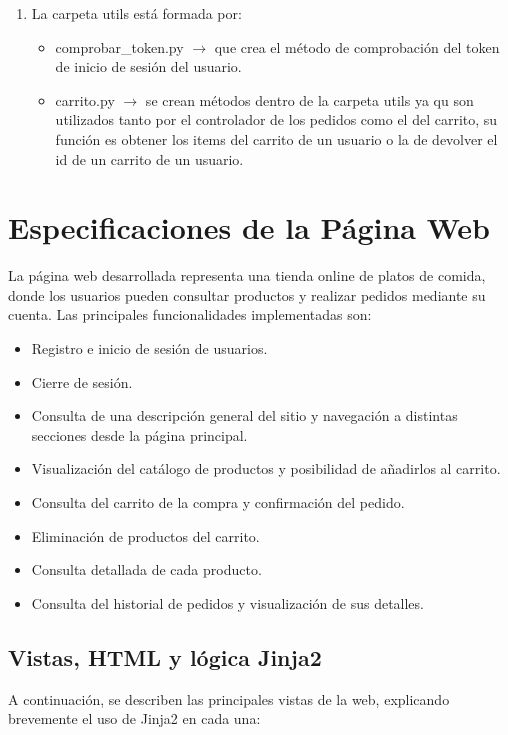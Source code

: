 \documentclass[10pt]{book}
\begin{document}
\begin{enumerate}
        \item La carpeta utils está formada por:
            \begin{itemize}
                \item comprobar\_token.py $\rightarrow$ que crea el método de comprobación del token de inicio de sesión del usuario.
                \item carrito.py $\rightarrow$ se crean métodos  dentro de la carpeta utils ya qu son utilizados tanto por el controlador de los pedidos como el del carrito, su función es obtener los items del carrito de un usuario o la de devolver el id de un carrito de un usuario.
            \end{itemize}
    \end{enumerate} 
        
\section{Especificaciones de la Página Web}

La página web desarrollada representa una tienda online de platos de comida, donde los usuarios pueden consultar productos y realizar pedidos mediante su cuenta. Las principales funcionalidades implementadas son:

\begin{itemize}
    \item Registro e inicio de sesión de usuarios.
    \item Cierre de sesión.
    \item Consulta de una descripción general del sitio y navegación a distintas secciones desde la página principal.
    \item Visualización del catálogo de productos y posibilidad de añadirlos al carrito.
    \item Consulta del carrito de la compra y confirmación del pedido.
    \item Eliminación de productos del carrito.
    \item Consulta detallada de cada producto.
    \item Consulta del historial de pedidos y visualización de sus detalles.
\end{itemize}
\newpage
\subsection{Vistas, HTML y lógica Jinja2}

A continuación, se describen las principales vistas de la web, explicando brevemente el uso de Jinja2 en cada una:
\end{document}
